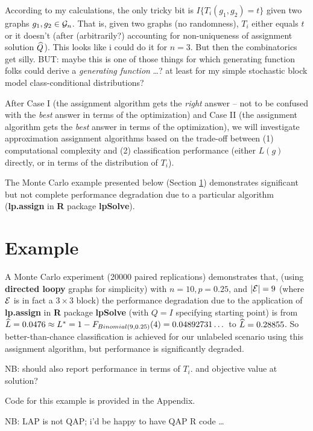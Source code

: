 According to my calculations,
the only tricky bit is $I\{T_i(g_1,g_2) = t\}$
given two graphs $g_1,g_2 \in \mathcal{G}_n$.
That is, given two graphs (no randomness),
$T_i$ either equals $t$ or it doesn't
(after (arbitrarily?) accounting for non-uniqueness
of assignment solution $\widehat{Q}$).
This looks like i could do it for $n=3$.
But then the combinatorics get silly.
BUT: maybe this is one of those things for which
generating function folks
could derive a {\em generating function} \dots?
at least for my simple stochastic block model
class-conditional distributions?


After Case I
(the assignment algorithm gets the {\em right} answer --
not to be confused with the {\em best} answer in terms of the optimization)
and Case II
(the assignment algorithm gets the {\em best} answer in terms of the optimization),
we will investigate approximation assignment algorithms based on the trade-off between
(1) computational complexity and
(2) classification performance
(either $L(g)$ directly, or in terms of the distribution of $T_i$).


The Monte Carlo example presented below (Section \ref{Example})
demonstrates significant but not complete performance degradation
due to a particular algorithm
({\bf lp.assign} in {\bf R} package {\bf lpSolve}).




\section{Example}\label{Example}

A Monte Carlo experiment (20000 paired replications) demonstrates that,
(using {\bf directed loopy} graphs for simplicity)
with $n=10, p=0.25$, and $|\mathcal{E}|=9$
(where $\mathcal{E}$ is in fact a $3 \times 3$ block)
the performance degradation due to the application of
{\bf lp.assign} in {\bf R} package {\bf lpSolve}
(with $Q=I$ specifying starting point)
is from
$\widehat{L} = 0.0476 \approx L^* = 1-F_{Binomial(9,0.25)}(4) = 0.04892731\dots$
to
 $\widehat{L} = 0.28855$.
So better-than-chance classification is achieved for our unlabeled scenario
using this assignment algorithm,
but performance is significantly degraded.

NB:
should also report performance in terms of $T_i$.
and objective value at solution?

Code for this example is provided in the Appendix.

NB: LAP is not QAP; i'd be happy to have QAP R code \dots


